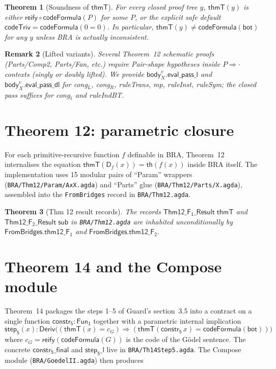 \documentclass[11pt]{article}
\newtheorem{theorem}{Theorem}
\newtheorem{remark}[theorem]{Remark}
\newcommand{\Deriv}{\mathsf{Deriv}}
\newcommand{\thmT}{\mathsf{thmT}}
\newcommand{\bot}{\mathsf{bot}}
\newcommand{\FunOne}{\mathsf{Fun_1}}
\newcommand{\reify}{\mathsf{reify}}
\newcommand{\codeFormula}{\mathsf{codeFormula}}
\newcommand{\codeTriv}{\mathsf{codeTriv}}
\newcommand{\imp}{\Rightarrow}
\begin{document}
\begin{theorem}[Soundness of $\thmT$]
\label{thm:sound}
For every closed proof tree $y$, $\thmT(y)$ is either $\reify
\circ \codeFormula(P)$ for some $P$, or the explicit safe default
$\codeTriv = \codeFormula(0=0)$.  In particular, $\thmT(y)
\neq \codeFormula(\bot)$ for any $y$ unless BRA is actually
inconsistent.
\end{theorem}

\begin{remark}[Lifted variants]
Several Theorem~12 schematic proofs (Parts/Comp2, Parts/Fan, etc.)
require Pair-shape hypotheses inside $P \imp \cdot$ contexts (singly or
doubly lifted).  We provide
$\mathsf{body}_X^v\!.\mathsf{eval\_pass\_l}$ and
$\mathsf{body}_X^v\!.\mathsf{eval\_pass\_dl}$ for cong$_L$, cong$_R$,
ruleTrans, mp, ruleInst, ruleSym; the closed pass suffices for cong$_1$
and ruleIndBT.
\end{remark}

\section{Theorem 12: parametric closure}

For each primitive-recursive function $f$ definable in BRA, Theorem~12
internalises the equation $\thmT(\mathsf{D}_f(x)) = \mathsf{th}(f(x))$
inside BRA itself.  The implementation uses 15 modular pairs of
``Param'' wrappers (\verb|BRA/Thm12/Param/AxX.agda|) and ``Parts''
glue (\verb|BRA/Thm12/Parts/X.agda|), assembled into the
\verb|FromBridges| record in \verb|BRA/Thm12.agda|.

\begin{theorem}[Thm 12 result records]
The records $\mathsf{Thm12\_F_1\_Result}\;\thmT$ and
$\mathsf{Thm12\_F_2\_Result}\;\mathsf{sub}$ in
\verb|BRA/Thm12.agda| are inhabited unconditionally by
$\mathsf{FromBridges.thm12\_F_1}$ and
$\mathsf{FromBridges.thm12\_F_2}$.
\end{theorem}

\section{Theorem 14 and the Compose module}

Theorem~14 packages the steps 1--5 of Guard's section~3.5 into a
contract on a single function $\mathsf{constr_5} : \FunOne$ together
with a parametric internal implication
\[
\mathsf{step_5}(x) :
  \Deriv\Big((\thmT(x) = c_G) \imp (\thmT(\mathsf{constr_5}\,x) = \codeFormula(\bot))\Big)
\]
where $c_G = \reify(\codeFormula(G))$ is the code of the G\"odel
sentence.  The concrete $\mathsf{constr_5\_final}$ and
$\mathsf{step_5\_l}$ live in \verb|BRA/Th14Step5.agda|.  The Compose
module (\verb|BRA/GoedelII.agda|) then produces
\end{document}
